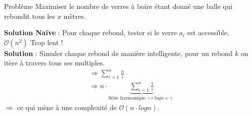 \begin{frame}
    \frametitle{\problemtitle}
        \begin{block}
            {Problème} Maximiser le nombre de verres à boire étant donné une balle qui rebondit tous les $x$ mètres.
        \end{block}
        \pause
        \textbf{Solution Naïve} : Pour chaque rebond, tester si le verre $a_i$ est accessible. $\mathcal O(n^2)$ Trop lent !\\
        \pause
        \textbf{Solution} : Simuler chaque rebond de manière intelligente, pour un rebond $k$ on itère à travers tous ses multiples. \\
        \pause
        \begin{align}
            &\Rightarrow \sum_{i=1}^{n} \frac{n}{i}\\
            &\Rightarrow n \cdot \underbrace{\sum_{i=1}^{n} \frac{1}{i}}_{\text{Série harmonique $\mapsto log n + \gamma$ }}
        \end{align}
        $\Rightarrow$ ce qui mène à une complexité de $\mathcal O(n \cdot log n)$.

\end{frame}
